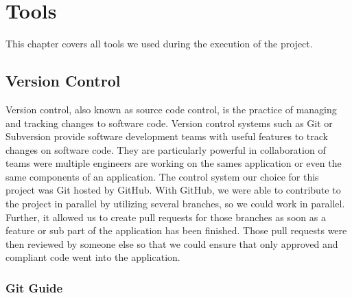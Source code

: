 \chapter{Tools}\label{ch:tools}

This chapter covers all tools we used during the execution of the project.


\section{Version Control}\label{sec:version-control}

Version control, also known as source code control, is the practice of managing and tracking changes to software code.
Version control systems such as Git or Subversion provide software development teams with useful features to track
changes on software code.
They are particularly powerful in collaboration of teams were multiple engineers are working on the sames application
or even the same components of an application.
The control system our choice for this project was Git hosted by GitHub.
With GitHub, we were able to contribute to the project in parallel by utilizing several branches, so we could work in
parallel.
Further, it allowed us to create pull requests for those branches as soon as a feature or sub part of the application
has been finished.
Those pull requests were then reviewed by someone else so that we could ensure that only approved and compliant code
went into the application.

\subsection{Git Guide}\label{subsec:git-guide}


